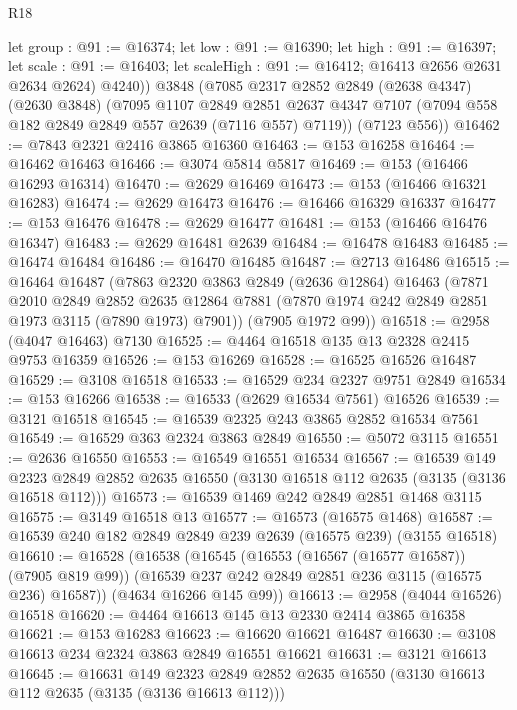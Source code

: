 \begin{lexlean}{R18}
\begin{coremodule}
        let group : @91 := @16374;
        let low : @91 := @16390;
        let high : @91 := @16397;
        let scale : @91 := @16403; let scaleHigh : @91 := @16412; @16413 @2656 @2631 @2634 @2624)
        @4240))
    @3848
    (@7085
      @2317
      @2852
      @2849
      (@2638 @4347)
      (@2630 @3848)
      (@7095
        @1107
        @2849
        @2851
        @2637
        @4347
        @7107
        (@7094 @558 @182 @2849 @2849 @557 @2639 (@7116 @557) @7119))
      (@7123 @556))
@16462 := @7843 @2321 @2416 @3865 @16360
@16463 := @153 @16258
@16464 := @16462 @16463
@16466 := @3074 @5814 @5817
@16469 := @153 (@16466 @16293 @16314)
@16470 := @2629 @16469
@16473 := @153 (@16466 @16321 @16283)
@16474 := @2629 @16473
@16476 := @16466 @16329 @16337
@16477 := @153 @16476
@16478 := @2629 @16477
@16481 := @153 (@16466 @16476 @16347)
@16483 := @2629 @16481 @2639
@16484 := @16478 @16483
@16485 := @16474 @16484
@16486 := @16470 @16485
@16487 := @2713 @16486
@16515 := @16464
    @16487
    (@7863
      @2320
      @3863
      @2849
      (@2636 @12864)
      @16463
      (@7871
        @2010
        @2849
        @2852
        @2635
        @12864
        @7881
        (@7870 @1974 @242 @2849 @2851 @1973 @3115 (@7890 @1973) @7901))
      (@7905 @1972 @99))
@16518 := @2958 (@4047 @16463) @7130
@16525 := @4464 @16518 @135 @13 @2328 @2415 @9753 @16359
@16526 := @153 @16269
@16528 := @16525 @16526 @16487
@16529 := @3108 @16518
@16533 := @16529 @234 @2327 @9751 @2849
@16534 := @153 @16266
@16538 := @16533 (@2629 @16534 @7561) @16526
@16539 := @3121 @16518
@16545 := @16539 @2325 @243 @3865 @2852 @16534 @7561
@16549 := @16529 @363 @2324 @3863 @2849
@16550 := @5072 @3115
@16551 := @2636 @16550
@16553 := @16549 @16551 @16534
@16567 := @16539
    @149
    @2323
    @2849
    @2852
    @2635
    @16550
    (@3130 @16518 @112 @2635 (@3135 (@3136 @16518 @112)))
@16573 := @16539 @1469 @242 @2849 @2851 @1468 @3115
@16575 := @3149 @16518 @13
@16577 := @16573 (@16575 @1468)
@16587 := @16539 @240 @182 @2849 @2849 @239 @2639 (@16575 @239) (@3155 @16518)
@16610 := @16528
    (@16538
      (@16545
        (@16553 (@16567 (@16577 @16587)) (@7905 @819 @99))
        (@16539 @237 @242 @2849 @2851 @236 @3115 (@16575 @236) @16587))
      (@4634 @16266 @145 @99))
@16613 := @2958 (@4044 @16526) @16518
@16620 := @4464 @16613 @145 @13 @2330 @2414 @3865 @16358
@16621 := @153 @16283
@16623 := @16620 @16621 @16487
@16630 := @3108 @16613 @234 @2324 @3863 @2849 @16551 @16621
@16631 := @3121 @16613
@16645 := @16631
    @149
    @2323
    @2849
    @2852
    @2635
    @16550
    (@3130 @16613 @112 @2635 (@3135 (@3136 @16613 @112)))

\end{coremodule}
\end{lexlean}

